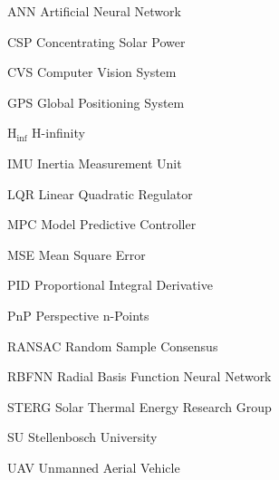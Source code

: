 \begin{Nomencl}[2cm]
   \item[ANN]		Artificial Neural Network
   \item[CSP] 		Concentrating Solar Power
   \item[CVS] 		Computer Vision System
   \item[GPS] 		Global Positioning System	
   \item[H$_{\inf}$]	H-infinity 
   \item[IMU]		Inertia Measurement Unit
   \item[LQR]		Linear Quadratic Regulator
   \item[MPC]		Model Predictive Controller
   \item[MSE]		Mean Square Error
   \item[PID]		Proportional Integral Derivative
   \item[PnP]		Perspective n-Points
   \item[RANSAC]	Random Sample Consensus
   \item[RBFNN]		Radial Basis Function Neural Network
   \item[STERG]		Solar Thermal Energy Research Group
   \item[SU]		Stellenbosch University
   \item[UAV]		Unmanned Aerial Vehicle

\end{Nomencl}

\endinput
